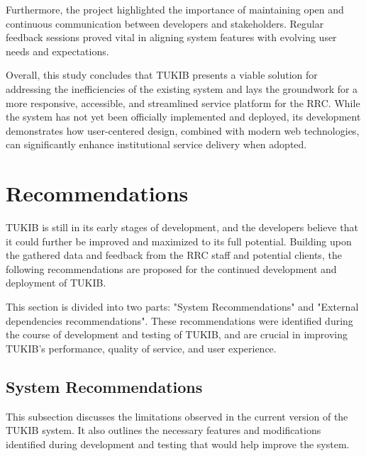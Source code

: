 Furthermore, the project highlighted the importance of maintaining open and continuous communication between developers and stakeholders. Regular feedback sessions proved vital in aligning system features with evolving user needs and expectations.

Overall, this study concludes that TUKIB presents a viable solution for addressing the inefficiencies of the existing system and lays the groundwork for a more responsive, accessible, and streamlined service platform for the RRC. While the system has not yet been officially implemented and deployed, its development demonstrates how user-centered design, combined with modern web technologies, can significantly enhance institutional service delivery when adopted.

\section{Recommendations}

TUKIB is still in its early stages of development, and the developers believe that it could further be improved and maximized to its full potential. Building upon the gathered data and feedback from the RRC staff and potential clients, the following recommendations are proposed for the continued development and deployment of TUKIB. 

This section is divided into two parts: "System Recommendations" and "External dependencies recommendations". These recommendations were identified during the course of development and testing of TUKIB, and are crucial in improving TUKIB's performance, quality of service, and user experience.

\subsection{System Recommendations}

This subsection discusses the limitations observed in the current version of the TUKIB system. It also outlines the necessary features and modifications identified during development and testing that would help improve the system.

